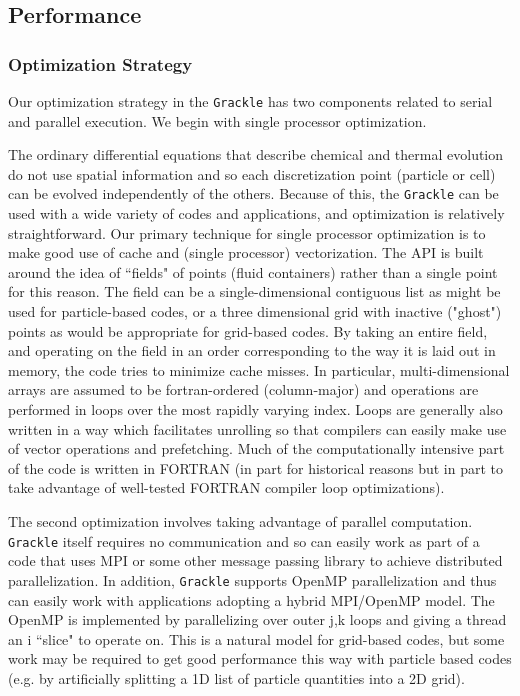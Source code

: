 \subsection{Performance}


\subsubsection{Optimization Strategy}

Our optimization strategy in the \texttt{Grackle} has two components related to serial and parallel execution.  We begin with single processor optimization.  

The ordinary differential equations that describe chemical and thermal evolution do not use spatial information and so each discretization point (particle or cell) can be evolved independently of the others.  Because of this, the \texttt{Grackle} can be used with a wide variety of codes and applications, and optimization is relatively straightforward.  Our primary technique for single processor optimization is to make good use of cache and (single processor) vectorization.  The API is built around the idea of ``fields" of points (fluid containers) rather than a single point for this reason.  The field can be a single-dimensional contiguous list as might be used for particle-based codes, or a three dimensional grid with inactive ("ghost") points as would be appropriate for grid-based codes.  By taking an entire field, and operating on the field in an order corresponding to the way it is laid out in memory, the code tries to minimize cache misses.  In particular, multi-dimensional arrays are assumed to be fortran-ordered (column-major) and operations are performed in loops over the most rapidly varying index.  Loops are generally also written in a way which facilitates unrolling so that compilers can easily make use of vector operations and prefetching.  Much of the computationally intensive part of the code is written in FORTRAN (in part for historical reasons but in part to take advantage of well-tested FORTRAN compiler loop optimizations).

The second optimization involves taking advantage of parallel computation.  \texttt{Grackle} itself requires no communication and so can easily work as part of a code that uses MPI or some other message passing library to achieve distributed parallelization.  In addition, \texttt{Grackle} supports OpenMP parallelization and thus can easily work with applications adopting a hybrid MPI/OpenMP model.  The OpenMP is implemented by parallelizing over outer j,k loops and giving a thread an i ``slice" to operate on.  This is a natural model for grid-based codes, but some work may be required to get good performance this way with particle based codes (e.g. by artificially splitting a 1D list of particle quantities into a 2D grid).

